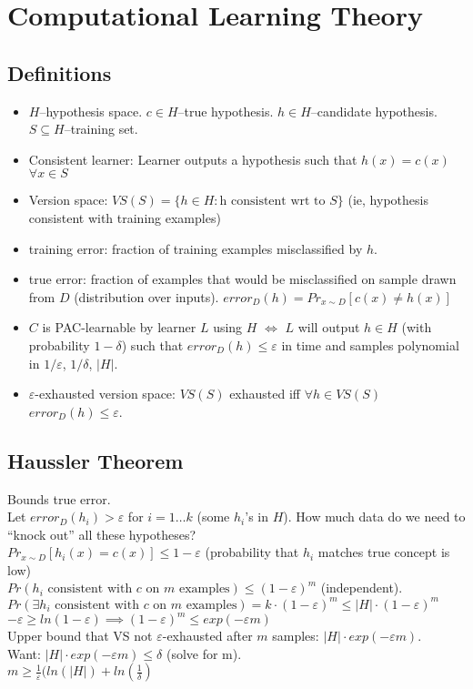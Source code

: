 \documentclass[11pt]{article}
\begin{document}
\section{Computational Learning Theory}
\subsection{Definitions}
\begin{itemize}
\item $H$--hypothesis space. $c \in H$--true hypothesis. $h \in H$--candidate hypothesis. $S \subseteq H$--training set.
\item Consistent learner: Learner outputs a hypothesis such that $h(x) = c(x)$ $\forall x \in S$
\item Version space: $VS(S) = \{ h \in H: $h$ \text{ consistent wrt to } S \}$ (ie, hypothesis consistent with training examples)
\item training error: fraction of training examples misclassified by $h$.
\item true error: fraction of examples that would be misclassified on sample drawn from $D$ (distribution over inputs). $error_D(h) = Pr_{x \sim D} [c(x) \neq h(x)]$
\item $C$ is PAC-learnable by learner $L$ using $H$ $\iff$ $L$ will output $h \in H$ (with probability $1-\delta$) such that $error_D(h) \leq \varepsilon$ in time and samples polynomial in $1/\varepsilon$, $1/ \delta$, $|H|$.
\item $\varepsilon$-exhausted version space: $VS(S)$ exhausted iff $\forall h \in VS(S)$ $error_D(h) \leq \varepsilon$.
\end{itemize}

\subsection{Haussler Theorem}
Bounds true error.\\
Let $error_D(h_i) > \varepsilon$ for $i = 1 \dots k$ (some $h_i$'s in $H$). How much data do we need to ``knock out'' all these hypotheses?\\
$Pr_{x \sim D} [h_i(x) = c(x)] \leq 1- \varepsilon$ (probability that $h_i$ matches true concept is low)\\
$Pr(h_i \text{ consistent with $c$ on $m$ examples}) \leq (1- \varepsilon)^m$ (independent).\\
$Pr(\exists h_i \text{ consistent with $c$ on $m$ examples}) = k \cdot (1- \varepsilon)^m \leq |H| \cdot (1-\varepsilon)^m$\\
$-\varepsilon \geq ln(1- \varepsilon) \implies (1- \varepsilon)^m \leq exp(-\varepsilon m)$\\
Upper bound that VS not $\varepsilon$-exhausted after $m$ samples: $|H|\cdot exp(-\varepsilon m)$.\\
Want: $|H| \cdot exp(-\varepsilon m) \leq \delta$ (solve for m).\\
$m \geq \frac{1}{\varepsilon} (ln(|H|) + ln (\frac{1}{\delta})$
\end{document}
